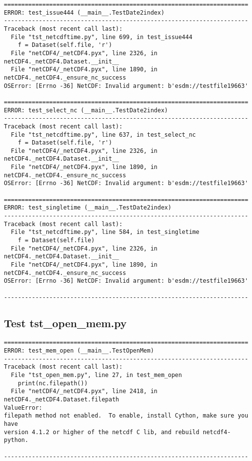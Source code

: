 \begin{verbatim}
======================================================================
ERROR: test_issue444 (__main__.TestDate2index)
----------------------------------------------------------------------
Traceback (most recent call last):
  File "tst_netcdftime.py", line 699, in test_issue444
    f = Dataset(self.file, 'r')
  File "netCDF4/_netCDF4.pyx", line 2326, in netCDF4._netCDF4.Dataset.__init__
  File "netCDF4/_netCDF4.pyx", line 1890, in netCDF4._netCDF4._ensure_nc_success
OSError: [Errno -36] NetCDF: Invalid argument: b'esdm://testfile19663'

======================================================================
ERROR: test_select_nc (__main__.TestDate2index)
----------------------------------------------------------------------
Traceback (most recent call last):
  File "tst_netcdftime.py", line 637, in test_select_nc
    f = Dataset(self.file, 'r')
  File "netCDF4/_netCDF4.pyx", line 2326, in netCDF4._netCDF4.Dataset.__init__
  File "netCDF4/_netCDF4.pyx", line 1890, in netCDF4._netCDF4._ensure_nc_success
OSError: [Errno -36] NetCDF: Invalid argument: b'esdm://testfile19663'

======================================================================
ERROR: test_singletime (__main__.TestDate2index)
----------------------------------------------------------------------
Traceback (most recent call last):
  File "tst_netcdftime.py", line 584, in test_singletime
    f = Dataset(self.file)
  File "netCDF4/_netCDF4.pyx", line 2326, in netCDF4._netCDF4.Dataset.__init__
  File "netCDF4/_netCDF4.pyx", line 1890, in netCDF4._netCDF4._ensure_nc_success
OSError: [Errno -36] NetCDF: Invalid argument: b'esdm://testfile19663'

----------------------------------------------------------------------
\end{verbatim}

\subsection{Test tst\_open\_mem.py}

\begin{verbatim}
======================================================================
ERROR: test_mem_open (__main__.TestOpenMem)
----------------------------------------------------------------------
Traceback (most recent call last):
  File "tst_open_mem.py", line 27, in test_mem_open
    print(nc.filepath())
  File "netCDF4/_netCDF4.pyx", line 2418, in netCDF4._netCDF4.Dataset.filepath
ValueError:
filepath method not enabled.  To enable, install Cython, make sure you have
version 4.1.2 or higher of the netcdf C lib, and rebuild netcdf4-python.

----------------------------------------------------------------------
\end{verbatim}

